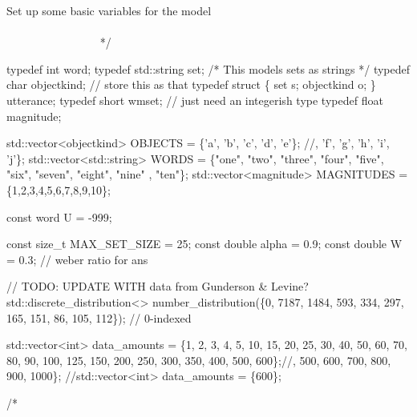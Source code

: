 \begin{DoxyCode}
    Set up some basic variables \textcolor{keywordflow}{for} the model
   ~~~~~~~~~~~~~~~~~~~~~~~~~~~~~~~~~~~~~~~~~~~~~~~~~~~~~~~~~~~~~~~~~~~~~~~~~~~~~~~~~~~~~~~~ */

\textcolor{keyword}{typedef} \textcolor{keywordtype}{int}         word;
\textcolor{keyword}{typedef} std::string \textcolor{keyword}{set};    \textcolor{comment}{/* This models sets as strings */}
\textcolor{keyword}{typedef} \textcolor{keywordtype}{char}        objectkind; \textcolor{comment}{// store this as that}
\textcolor{keyword}{typedef} \textcolor{keyword}{struct }\{ \textcolor{keyword}{set} s; objectkind o; \} utterance; 
\textcolor{keyword}{typedef} \textcolor{keywordtype}{short}       wmset; \textcolor{comment}{// just need an integerish type}
\textcolor{keyword}{typedef} \textcolor{keywordtype}{float}       magnitude; 

std::vector<objectkind>   OBJECTS = \{\textcolor{charliteral}{'a'}, \textcolor{charliteral}{'b'}, \textcolor{charliteral}{'c'}, \textcolor{charliteral}{'d'}, \textcolor{charliteral}{'e'}\}; \textcolor{comment}{//, 'f', 'g', 'h', 'i', 'j'\};}
std::vector<std::string>    WORDS = \{\textcolor{stringliteral}{"one"}, \textcolor{stringliteral}{"two"}, \textcolor{stringliteral}{"three"}, \textcolor{stringliteral}{"four"}, \textcolor{stringliteral}{"five"}, \textcolor{stringliteral}{"six"}, \textcolor{stringliteral}{"seven"}, \textcolor{stringliteral}{"eight"}, \textcolor{stringliteral}{"nine"}
      , \textcolor{stringliteral}{"ten"}\};
std::vector<magnitude> MAGNITUDES = \{1,2,3,4,5,6,7,8,9,10\};

\textcolor{keyword}{const} word U = -999;

\textcolor{keyword}{const} \textcolor{keywordtype}{size\_t} MAX\_SET\_SIZE = 25;
\textcolor{keyword}{const} \textcolor{keywordtype}{double} alpha = 0.9;
\textcolor{keyword}{const} \textcolor{keywordtype}{double} W = 0.3; \textcolor{comment}{// weber ratio for ans}

\textcolor{comment}{// TODO: UPDATE WITH data from Gunderson & Levine?}
std::discrete\_distribution<> number\_distribution(\{0, 7187, 1484, 593, 334, 297, 165, 151, 86, 105, 112\}); \textcolor{comment}{
      // 0-indexed}

std::vector<int> data\_amounts = \{1, 2, 3, 4, 5, 10, 15, 20, 25, 30, 40, 50, 60, 70, 80, 90, 100, 125, 150, 
      200, 250, 300, 350, 400, 500, 600\};\textcolor{comment}{//, 500, 600, 700, 800, 900, 1000\};}
\textcolor{comment}{//std::vector<int> data\_amounts = \{600\};}

\textcolor{comment}{/*}
\end{DoxyCode}
